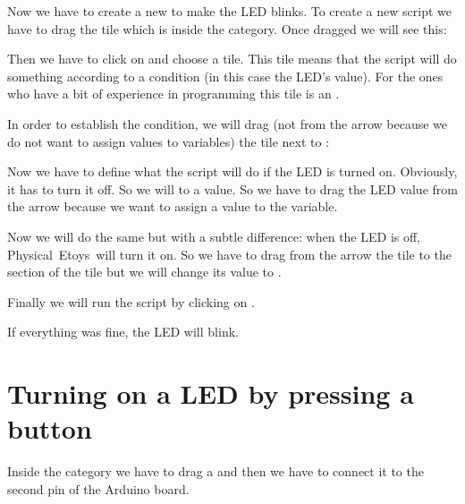 \documentclass[english]{etoys-guide}
\def\appName{Physical~Etoys~}
\begin{document}

Now we have to create a new  to make the LED blinks. To create a new
script we have to drag the  tile which is inside the
 category.  Once dragged we will see this:


Then we have to click on  and choose a \testtile{} tile.
This tile means that the script will do something according to a condition (in
this case the LED's value). For the ones who have a bit of experience in
programming this tile is an . 


In order to establish the condition, we will drag (not from the
 arrow because we do not want to assign values to variables)
the  tile next to :


Now we have to define what the script will do if the LED is turned on.
Obviously, it has to turn it off. So we will  to  a  value. So we have to drag the LED value from the
 arrow because we want to assign a value to the variable. 





Now we will do the same but with a subtle difference: when the LED is off,
\appName will turn it on.  So we have to drag from the 
arrow the  tile to the  section of the \testtile{}
tile but we will change its value to . 


Finally we will run the script by clicking on . 


If everything was fine, the LED will blink.

\section{Turning on a LED by pressing a button}

Inside the  category we have to drag a  and then we have to connect it to the second pin of the Arduino board.
\end{document}
